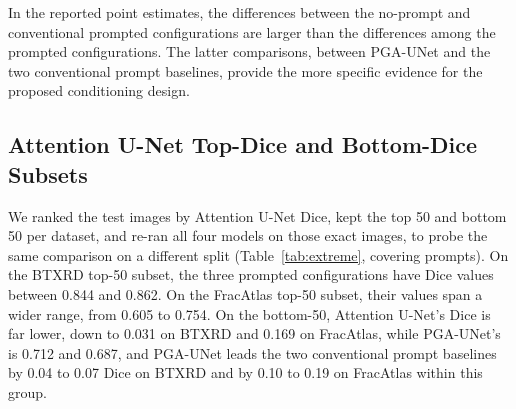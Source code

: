 \begin{table}[t]
\caption{Comparison at $512\times512$ under covering prompts. Attention U-Net (no prompt) receives no box; the other rows use the same box PGA-UNet receives. The Delta Dice column is each row minus PGA-UNet.}
\label{tab:baseline}
\centering
\scriptsize
{}
\end{table}

In the reported point estimates, the differences between the no-prompt and conventional prompted configurations are larger than the differences among the prompted configurations. The latter comparisons, between PGA-UNet and the two conventional prompt baselines, provide the more specific evidence for the proposed conditioning design.

\subsection{Attention U-Net Top-Dice and Bottom-Dice Subsets}
\label{sec:extreme}
We ranked the test images by Attention U-Net Dice, kept the top 50 and bottom 50 per dataset, and re-ran all four models on those exact images, to probe the same comparison on a different split (Table~\ref{tab:extreme}, covering prompts). On the BTXRD top-50 subset, the three prompted configurations have Dice values between 0.844 and 0.862. On the FracAtlas top-50 subset, their values span a wider range, from 0.605 to 0.754. On the bottom-50, Attention U-Net's Dice is far lower, down to 0.031 on BTXRD and 0.169 on FracAtlas, while PGA-UNet's is 0.712 and 0.687, and PGA-UNet leads the two conventional prompt baselines by 0.04 to 0.07 Dice on BTXRD and by 0.10 to 0.19 on FracAtlas within this group.

